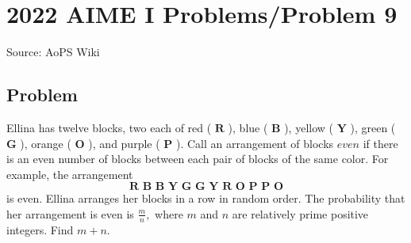 \documentclass[12pt]{article}
\begin{document}
\section*{{2022 AIME I Problems/Problem 9}}
Source: AoPS Wiki

\subsection*{Problem}
Ellina has twelve blocks, two each of red ( $\textbf{R}$ ), blue ( $\textbf{B}$ ), yellow ( $\textbf{Y}$ ), green ( $\textbf{G}$ ), orange ( $\textbf{O}$ ), and purple ( $\textbf{P}$ ). Call an arrangement of blocks $\textit{even}$ if there is an even number of blocks between each pair of blocks of the same color. For example, the arrangement \[\textbf{R B B Y G G Y R O P P O}\] is even. Ellina arranges her blocks in a row in random order. The probability that her arrangement is even is $\frac{m}{n},$ where $m$ and $n$ are relatively prime positive integers. Find $m+n.$
\end{document}
